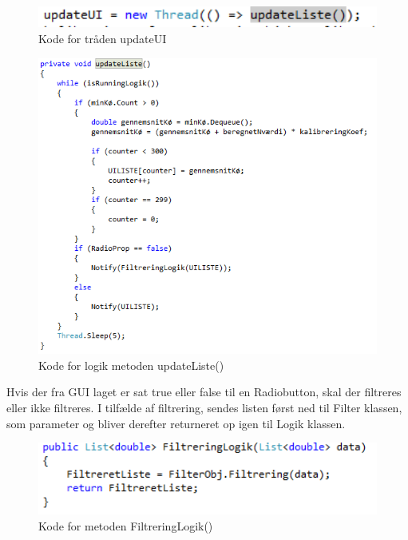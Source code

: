 \begin{figure}[H]
	\centering
	\includegraphics[width=1.0\textwidth]{FigurerProgram/updateUI}
	\caption{Kode for tråden updateUI}
\end{figure}

\begin{figure}[H]
	\centering
	\includegraphics[width=1.0\textwidth]{FigurerProgram/updateListe}
	\caption{Kode for logik metoden updateListe()}
\end{figure}

Hvis der fra GUI laget er sat true eller false til en Radiobutton, skal der filtreres eller ikke filtreres. I tilfælde af filtrering, sendes listen først ned til Filter klassen, som parameter og bliver derefter returneret op igen til Logik klassen.

\begin{figure}[H]
	\centering
	\includegraphics[width=1.0\textwidth]{FigurerProgram/FiltreringLogik}
	\caption{Kode for metoden FiltreringLogik()}
\end{figure}


